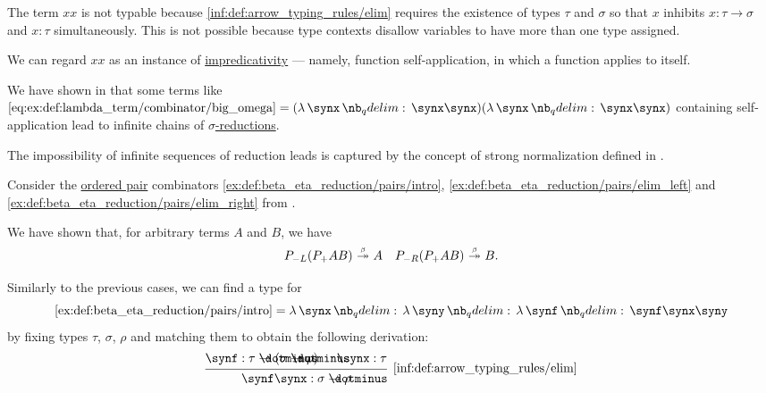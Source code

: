 \begin{example}
\begin{thmenum}
     The term \( xx \) is not typable because \ref{inf:def:arrow_typing_rules/elim} requires the existence of types \( \tau \) and \( \sigma \) so that \( x \) inhibits \( x: \tau \to \sigma \) and \( x: \tau \) simultaneously. This is not possible because type contexts disallow variables to have more than one type assigned.

    We can regard \( xx \) as an instance of \hyperref[con:impredicativity]{impredicativity} --- namely, function self-application, in which a function applies to itself.

    We have shown in  that some terms like \( \ref{eq:ex:def:lambda_term/combinator/big_omega} = (\qabs \synx \synx \synx) (\qabs \synx \synx \synx) \) containing self-application lead to infinite chains of \hyperref[def:beta_eta_reduction]{\( \sigma \)-reductions}.

    The impossibility of infinite sequences of reduction leads is captured by the concept of strong normalization defined in .

     Consider the \hyperref[def:ordered_tuple]{ordered pair} combinators \ref{ex:def:beta_eta_reduction/pairs/intro}, \ref{ex:def:beta_eta_reduction/pairs/elim_left} and \ref{ex:def:beta_eta_reduction/pairs/elim_right} from .

    We have shown that, for arbitrary terms \( A \) and \( B \), we have
    \begin{align*}
      P_{-L} (P_+ A B) \bred* A
      &&
      P_{-R} (P_+ A B) \bred* B.
    \end{align*}

    Similarly to the previous cases, we can find a type for
    \begin{equation*}
      \ref{ex:def:beta_eta_reduction/pairs/intro} = \qabs \synx \qabs \syny \qabs \synf \synf \synx \syny
    \end{equation*}
    by fixing types \( \tau \), \( \sigma \), \( \rho \) and matching them to obtain the following derivation:
    \begin{equation*}
      \begin{prooftree}
        \hypo{ \synf: \tau \synimplies (\sigma \synimplies \rho) }
        \hypo{ \synx: \tau }
        \infer2[\ref{inf:def:arrow_typing_rules/elim}]{ \synf \synx: \sigma \synimplies \rho }


\end{prooftree}
\end{equation*}
\end{thmenum}
\end{example}
